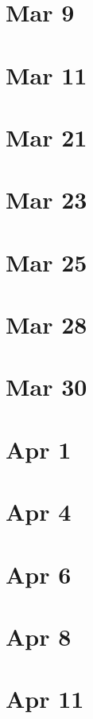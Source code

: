 \documentclass[12pt]{book}
\newcommand{\<}{\langle}
\renewcommand{\>}{\rangle}
\numberwithin{equation}{section}
\theoremstyle{plain}
\theoremstyle{definition}
\theoremstyle{remark}
\begin{document}
\section*{Mar 9}

\section*{Mar 11}

\section*{Mar 21}

\section*{Mar 23}

\section*{Mar 25}

\section*{Mar 28}

\section*{Mar 30}

\section*{Apr 1}

\section*{Apr 4}

\section*{Apr 6}

\section*{Apr 8}

\section*{Apr 11}
\end{document}
